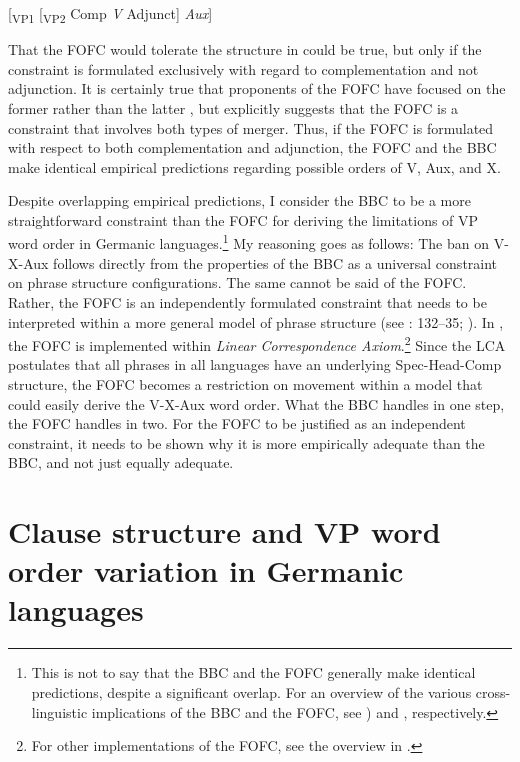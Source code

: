 \documentclass[output=paper, colorlinks, citecolor=brown]{langscibook}
\begin{document}
\ea {}[\textsubscript{VP1} [\textsubscript{VP2} {Comp} \textit{V} {Adjunct}] \textit{Aux}]\label{ex:sangfelt:10}\z


That the FOFC would tolerate the structure in  could be true, but only if the constraint is formulated exclusively with regard to complementation and not adjunction. It is certainly true that proponents of the FOFC have focused on the former rather than the latter \citep[97]{Sheehan2017Final}, but \citet{Sheehan2017Final} explicitly suggests that the FOFC is a constraint that involves both types of merger. Thus, if the FOFC is formulated with respect to both complementation and adjunction, the FOFC and the BBC make identical empirical predictions regarding possible orders of V, Aux, and X.

Despite overlapping empirical predictions, I consider the BBC to be a more straightforward constraint than the FOFC for deriving the limitations of VP word order in Germanic languages.\footnote{This is not to say that the BBC and the FOFC generally make identical predictions, despite a significant overlap. For an overview of the various cross-linguistic implications of the BBC and the FOFC, see \citealt[10–17, 65–94]{Haider2013}) and \citet[173–205]{BiberauerEtAl2014}, respectively.} My reasoning goes as follows: The ban on V-X-Aux follows directly from the properties of the BBC as a universal constraint on phrase structure configurations. The same cannot be said of the FOFC. Rather, the FOFC is an independently formulated constraint that needs to be interpreted within a more general model of phrase structure (see \citealt{Haider2013}: 132–35; \citealt[205–215]{BiberauerEtAl2014}). In \citet{BiberauerEtAl2014}, the FOFC is implemented within  \textit{Linear Correspondence Axiom}.\footnote{For other implementations of the FOFC, see the overview in \citet{Holmberg2017}.}  Since the LCA postulates that all phrases in all languages have an underlying Spec-Head-Comp structure, the FOFC becomes a restriction on movement within a model that could easily derive the V-X-Aux word order. What the BBC handles in one step, the FOFC handles in two. For the FOFC to be justified as an independent constraint, it needs to be shown why it is more empirically adequate than the BBC, and not just equally adequate.


\section{Clause structure and VP word order variation in Germanic languages}\label{sec:sangfelt:3}
\end{document}
